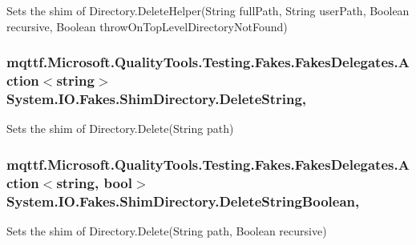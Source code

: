 Sets the shim of Directory.\-Delete\-Helper(\-String full\-Path, String user\-Path, Boolean recursive, Boolean throw\-On\-Top\-Level\-Directory\-Not\-Found)

\hypertarget{class_system_1_1_i_o_1_1_fakes_1_1_shim_directory_a782070a7758b276c286a30b2e72fd3f1}{
\subsubsection[{Delete\-String}]{\setlength{\rightskip}{0pt plus 5cm}mqttf.\-Microsoft.\-Quality\-Tools.\-Testing.\-Fakes.\-Fakes\-Delegates.\-Action$<$string$>$ System.\-I\-O.\-Fakes.\-Shim\-Directory.\-Delete\-String\hspace{0.3cm}{\ttfamily [static]}, {\ttfamily [set]}}}\label{class_system_1_1_i_o_1_1_fakes_1_1_shim_directory_a782070a7758b276c286a30b2e72fd3f1}


Sets the shim of Directory.\-Delete(\-String path)

\hypertarget{class_system_1_1_i_o_1_1_fakes_1_1_shim_directory_a95d1db8e258c01b8651dead2427c2177}{
\subsubsection[{Delete\-String\-Boolean}]{\setlength{\rightskip}{0pt plus 5cm}mqttf.\-Microsoft.\-Quality\-Tools.\-Testing.\-Fakes.\-Fakes\-Delegates.\-Action$<$string, bool$>$ System.\-I\-O.\-Fakes.\-Shim\-Directory.\-Delete\-String\-Boolean\hspace{0.3cm}{\ttfamily [static]}, {\ttfamily [set]}}}\label{class_system_1_1_i_o_1_1_fakes_1_1_shim_directory_a95d1db8e258c01b8651dead2427c2177}


Sets the shim of Directory.\-Delete(\-String path, Boolean recursive)

